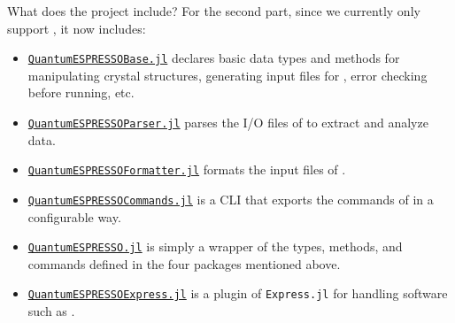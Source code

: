 \begin{frame}[allowframebreaks]{What does the \express{} project include?}
    For the second part, since we currently only support \qe{}, it now includes:
    {\footnotesize
    \begin{itemize}
        \item \href{https://github.com/MineralsCloud/QuantumESPRESSOBase.jl}{\texttt{QuantumESPRESSOBase.jl}}
              declares basic data types and methods
              for manipulating crystal structures, generating input files for \qe{},
              error checking before running, etc.
        \item \href{https://github.com/MineralsCloud/QuantumESPRESSOParser.jl}{\texttt{QuantumESPRESSOParser.jl}}
              parses the I/O files of \qe{} to extract and analyze data.
        \item \href{https://github.com/MineralsCloud/QuantumESPRESSOFormatter.jl}{\texttt{QuantumESPRESSOFormatter.jl}}
              formats the input files of \qe{}.
        \item \href{https://github.com/MineralsCloud/QuantumESPRESSOCommands.jl}{\texttt{QuantumESPRESSOCommands.jl}}
              is a CLI that exports the commands of \qe{} in a configurable way.
        \item \href{https://github.com/MineralsCloud/QuantumESPRESSO.jl}{\texttt{QuantumESPRESSO.jl}}
              is simply a wrapper of the types, methods, and commands defined in
              the four packages mentioned above.
        \item \href{https://github.com/MineralsCloud/QuantumESPRESSOExpress.jl}{\texttt{QuantumESPRESSOExpress.jl}}
              is a plugin of \texttt{Express.jl} for handling \ab{} software such as \qe{}.
    \end{itemize}
    }
\end{frame}
